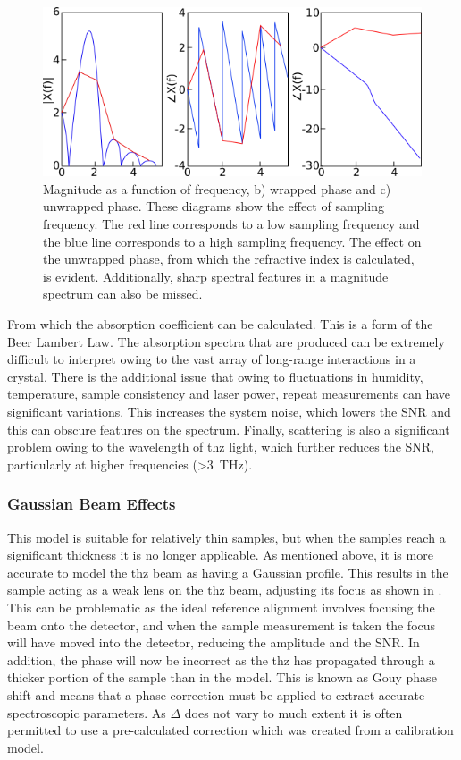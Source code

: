 \begin{figure}
    \centering
    \includegraphics{Figures/Misc/Theory/AliasingMagPhase.png}
    \captionsetup{font = footnotesize, justification = centering}
    \caption{Magnitude as a function of frequency, b) wrapped phase and c) unwrapped phase. These diagrams show the effect of sampling frequency. The red line corresponds to a low sampling frequency and the blue line corresponds to a high sampling frequency. The effect on the unwrapped phase, from which the refractive index is calculated, is evident. Additionally, sharp spectral features in a magnitude spectrum can also be missed.}
    \label{fig:aliasing}
\end{figure}

From which the absorption coefficient can be calculated. This is a form of the Beer Lambert Law. The absorption spectra that are produced can be extremely difficult to interpret owing to the vast array of long-range interactions in a crystal. There is the additional issue that owing to fluctuations in humidity, temperature, sample consistency and laser power, repeat measurements can have significant variations. This increases the system noise, which lowers the SNR and this can obscure features on the spectrum. Finally, scattering is also a significant problem owing to the wavelength of \acrshort{thz} light, which further reduces the SNR, particularly at higher frequencies (>\SI{3}{THz}).

\subsubsection{Gaussian Beam Effects}
This model is suitable for relatively thin samples, but when the samples reach a significant thickness it is no longer applicable. As mentioned above, it is more accurate to model the \acrshort{thz} beam as having a Gaussian profile. This results in the sample acting as a weak lens on the \acrshort{thz} beam, adjusting its focus as shown in .
This can be problematic as the ideal reference alignment involves focusing the beam onto the detector, and when the sample measurement is taken the focus will have moved into the detector, reducing the amplitude and the SNR. In addition, the phase will now be incorrect as the \acrshort{thz} has propagated through a thicker portion of the sample than in the model. This is known as Gouy phase shift and means that a phase correction must be applied to extract accurate spectroscopic parameters. As \(\Delta\) does not vary to much extent it is often permitted to use a pre-calculated correction which was created from a calibration model. 

